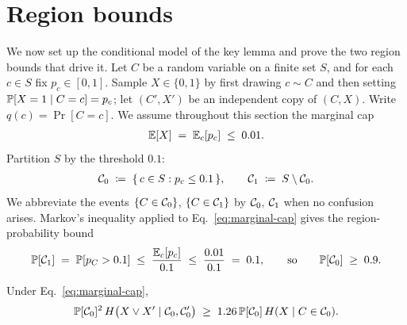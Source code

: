 \section{Region bounds}
\label{sec:region}

We now set up the conditional model of the key lemma and prove the two region
bounds that drive it. Let $C$ be a random variable on a finite set $S$, and for
each $c \in S$ fix $p_c \in [0,1]$. Sample $X \in \{0,1\}$ by first drawing
$c \sim C$ and then setting $\mathbb{P}[X = 1 \mid C = c] = p_c$; let $(C', X')$ be an
independent copy of $(C, X)$. Write $q(c) = \Pr[C = c]$. We assume throughout
this section the marginal cap
\begin{align}
\mathbb{E}[X] \;=\; \mathbb{E}_{c}[p_c] \;\le\; 0.01. \label{eq:marginal-cap}
\end{align}
Partition $S$ by the threshold $0.1$:
\begin{align*}
\mathcal{C}_0 \;\coloneqq\; \{\, c \in S : p_c \le 0.1 \,\}, \qquad
\mathcal{C}_1 \;\coloneqq\; S \setminus \mathcal{C}_0.
\end{align*}
We abbreviate the events $\{C \in \mathcal{C}_0\}$, $\{C \in \mathcal{C}_1\}$ by $\mathcal{C}_0$, $\mathcal{C}_1$ when no
confusion arises. Markov's inequality applied to Eq.~\eqref{eq:marginal-cap}
gives the region-probability bound
\begin{align}
\mathbb{P}[\mathcal{C}_1] \;=\; \mathbb{P}[p_C > 0.1] \;\le\; \frac{\mathbb{E}_c[p_c]}{0.1} \;\le\; \frac{0.01}{0.1} \;=\; 0.1,
\qquad\text{so}\qquad \mathbb{P}[\mathcal{C}_0] \;\ge\; 0.9. \label{eq:markov-region}
\end{align}

\begin{lemma}
\label{lem:region-low}
Under Eq.~\eqref{eq:marginal-cap},
\begin{align*}
\mathbb{P}[\mathcal{C}_0]^2\, H\bigl(X \vee X' \mid \mathcal{C}_0, \mathcal{C}_0'\bigr)
\;\ge\; 1.26\,\mathbb{P}[\mathcal{C}_0]\, H(X \mid C \in \mathcal{C}_0).
\end{align*}
\end{lemma}


